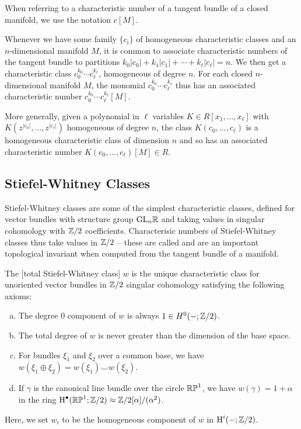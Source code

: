 \begin{convention*}
	When referring to a characteristic number of a tangent bundle of a closed manifold, we use the notation $c[M]$.
\end{convention*}

\begin{remark}\label{rmk:characteristic-number-monomial-polynomial}
	Whenever we have some family $\{c_i\}$ of homogeneous characteristic classes and an $n$-dimensional manifold $M$, it is common to associate characteristic numbers of the tangent bundle to partitions $k_0|c_0|+k_1|c_1|+\cdots+k_\ell|c_\ell| = n$. We then get a characteristic class $c_0^{k_0}\cdots c_\ell^{k_\ell}$, homogeneous of degree $n$. For each closed $n$-dimensional manifold $M$, the monomial $c_0^{k_0}\cdots c_\ell^{k_\ell}$ thus has an associated characteristic number $c_0^{k_0}\cdots c_\ell^{k_\ell}[M]$. 

	More generally, given a polynomial in $\ell$ variables $K\in R[x_1,\ldots, x_\ell]$ with $K(z^{|c_0|}, \ldots, z^{|c_\ell|})$ homogeneous of degree $n$, the class $K(c_0,\ldots, c_\ell)$ is a homogeneous characteristic class of dimension $n$ and so has
	an associated characteristic number $K(c_0, \ldots, c_\ell)[M] \in R$.
\end{remark}

\subsection{Stiefel-Whitney Classes}

Stiefel-Whitney classes are some of the simplest characteristic classes, defined for vector bundles with structure group $\mathrm{GL}_n\mathbb{R}$ and taking values in singular cohomology with $\mathbb{Z}/2$ coefficients. Characterisic numbers of Stiefel-Whitney classes thus take values in $\mathbb{Z}/2$ -- these are called  and are an important topological invariant when computed from the tangent bundle of a manifold.

\begin{definition}
	The [total Stiefel-Whitney class] $w$ is the unique characteristic class for unoriented vector bundles in $\mathbb{Z}/2$ singular cohomology satisfying the following axioms:
	\begin{enumerate}[(a)]
		\item The degree $0$ component of $w$ is always $1\in H^0(-; \mathbb{Z}/2)$.
		\item The total degree of $w$ is never greater than the dimension of the base space.
		\item For bundles $\xi_1$ and $\xi_2$ over a common base, we have $w(\xi_1\oplus \xi_2)=w(\xi_1)\smile w(\xi_2)$. 
		\item If $\gamma$ is the canonical line bundle over the circle $\mathbb{RP}^1$, we have $w(\gamma)=1+\alpha$ in the ring $\operatorname{H}^\bullet(\mathbb{RP}^1; \mathbb{Z}/2)\approx \mathbb{Z}/2[\alpha]/(\alpha^2)$.
	\end{enumerate}
	Here, we set $w_i$ to be the homogeneous component of $w$ in $\operatorname{H}^i(-;\mathbb{Z}/2)$.
\end{definition}

